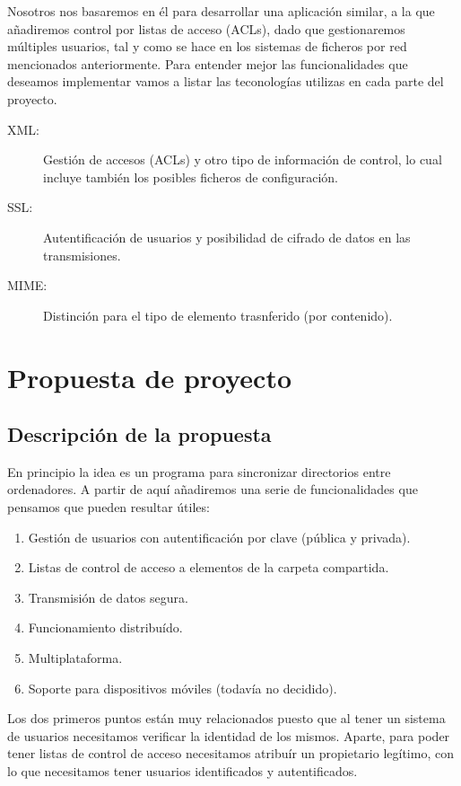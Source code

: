 \documentclass[a4paper,12pt,titlepage]{article}
\begin{document}
Nosotros nos basaremos en él para desarrollar una aplicación similar, a la que
añadiremos control por listas de acceso (ACLs), dado que gestionaremos
múltiples usuarios, tal y como se hace en los sistemas de ficheros por red
mencionados anteriormente. Para entender mejor las funcionalidades que
deseamos implementar vamos a listar las teconologías utilizas en cada parte
del proyecto.

\label{tecnologias}
\begin{description}
\item[XML:] Gestión de accesos (ACLs) y otro tipo de información de control,
lo cual incluye también los posibles ficheros de configuración.
\item[SSL:] Autentificación de usuarios y posibilidad de cifrado de datos en
las transmisiones.
\item[MIME:] Distinción para el tipo de elemento trasnferido (por contenido).
\end{description}


\section{Propuesta de proyecto}

\subsection{Descripción de la propuesta}

En principio la idea es un programa para sincronizar directorios entre
ordenadores. A partir de aquí añadiremos una serie de funcionalidades que
pensamos que pueden resultar útiles:

\begin{enumerate}
\item Gestión de usuarios con autentificación por clave (pública y privada).
\item Listas de control de acceso a elementos de la carpeta compartida.
\item Transmisión de datos segura.
\item Funcionamiento distribuído.
\item Multiplataforma.
\item Soporte para dispositivos móviles (todavía no decidido).
\end{enumerate}

Los dos primeros puntos están muy relacionados puesto que al tener un sistema
de usuarios necesitamos verificar la identidad de los mismos. Aparte, para
poder tener listas de control de acceso necesitamos atribuír un propietario
legítimo, con lo que necesitamos tener usuarios identificados y
autentificados.
\end{document}

